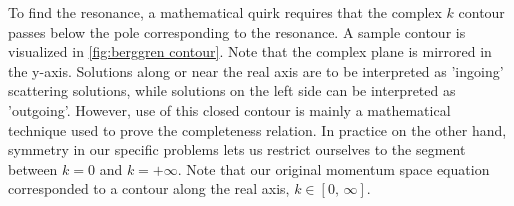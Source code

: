 \documentclass[../main/report.tex]{subfiles}
\begin{document}


To find the resonance, a mathematical quirk requires that the complex $k$ contour passes below the pole corresponding to the resonance. 
A sample contour is visualized in \cref{fig:berggren contour}. Note that the complex plane is mirrored in the y-axis. 
Solutions along or near the real axis are to be interpreted as 'ingoing' scattering solutions, while solutions on the left side can be interpreted as 'outgoing'. 
However, use of this closed contour is mainly a mathematical technique used to prove the completeness relation. 
In practice on the other hand, symmetry in our specific problems lets us restrict ourselves to the segment between $k=0$ and $k=+\infty$. 
Note that our original momentum space equation corresponded to a contour along the real axis, $k \in [0,\, \infty]$.


\end{document}
